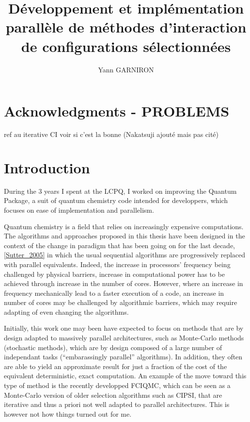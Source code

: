 \documentclass[12pt,a4paper]{report}
\title{Développement et implémentation parallèle de méthodes d'interaction de configurations sélectionnées}
\author{Yann GARNIRON}
\begin{document}
\dominitoc


\newpage

\chapter*{Acknowledgments - PROBLEMS}





ref au iterative CI voir si c'est la bonne (Nakatsuji ajouté mais pas cité)



\newpage

\tableofcontents
\newpage


\chapter{Introduction}

During the 3 years I spent at the LCPQ, I worked on improving the Quantum Package, a suit of quantum chemistry code intended for developpers, which focuses on ease of implementation and parallelism.

Quantum chemistry is a field that relies on increasingly expensive computations. The algorithms and approaches proposed in this thesis have been designed in the context of the change in paradigm that has been going on for the last decade,\ref{Sutter_2005} in which the usual sequential algorithms are progressively replaced with parallel equivalents. Indeed, the increase in processors' frequency being challenged by physical barriers, increase in computational power has to be achieved through increase in the number of cores. However, where an increase in frequency mechanically lead to a faster execution of a code, an increase in number of cores may be challenged by algorithmic barriers, which may require adapting of even changing the algorithms.

Initially, this work one may been have expected to focus on methods that are by design adapted to massively parallel architectures, such as Monte-Carlo methods (stochastic methods), which are by design composed of a large number of independant tasks (``embarassingly parallel'' algorithms). In addition, they often are able to yield an approximate result for just a fraction of the cost of the equivalent deterministic, exact computation. An example of the move toward this type of method is the recently developped FCIQMC, which can be seen as a Monte-Carlo version of older selection algorithms such as CIPSI, that are iterative and thus a priori not well adapted to parallel architectures. This is however not how things turned out for me.
\end{document}
